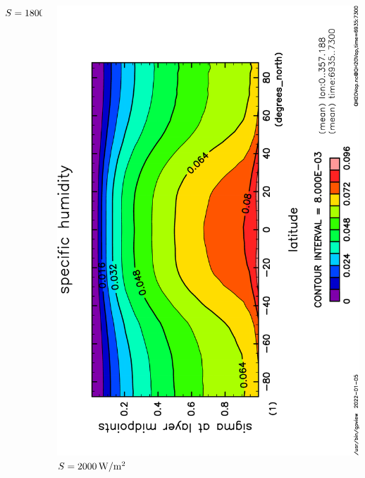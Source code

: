 \documentclass[aspectratio=149,9pt,fleqn]{beamer}
\begin{document}
\begin{frame}
\begin{columns}[T]
\begin{column}{.3\textwidth}
			\(S=1800\hmu{W/m^2}\)
		\end{column}
		\begin{column}{.3\textwidth}
			\centering
			\includegraphics[height=\textwidth,angle=-90]{S2000/QH2OVap,time=6935:7300-crop.pdf}
			\(S=2000\hmu{W/m^2}\)
		\end{column}
	\end{columns}
\end{frame}
\end{document}
